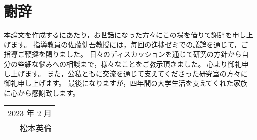 \chapter*{謝辞}
本論文を作成するにあたり，お世話になった方々にこの場を借りて謝辞を申し上げます。
指導教員の佐藤健吾教授には，毎回の進捗ゼミでの議論を通じて，ご指導ご鞭撻を賜りました。%
日々のディスカッションを通じて研究の方針から自分の些細な悩みへの相談まで，様々なことをご教示頂きました。
心より御礼申し上げます。
また，公私ともに交流を通じて支えてくださった研究室の方々に御礼申し上げます。
最後になりますが，四年間の大学生活を支えてくれた家族に心から感謝致します。

\vfil\hfill
\begin{tabular}[b]{r}
  2023 年 2 月\\
  {\large 松本英倫}\\ %
\end{tabular}
